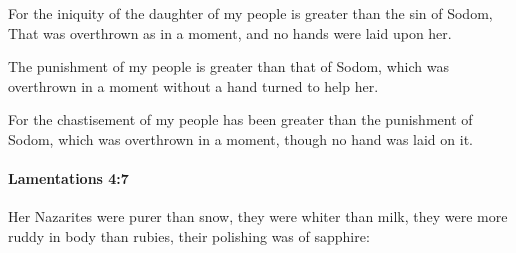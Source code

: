 			\begin{versebox}
					\item[BHS] 
					\item[LXX] 
					\item[ASV] For the iniquity of the daughter of my people is greater than the sin of Sodom, That was overthrown as in a moment, and no hands were laid upon her.
					\item[NIV] The punishment of my people is greater than that of Sodom, which was overthrown in a moment without a hand turned to help her.
					\item[NRSV] For the chastisement of my people has been greater than the punishment of Sodom, which was overthrown in a moment, though no hand was laid on it.
			\end{versebox}

		\paragraph{Lamentations 4:7} %
			\label{LAMENTATIONS-4-7}

			Her Nazarites were purer than snow, they were whiter than milk, they were more ruddy in body than rubies, their polishing was of sapphire:

